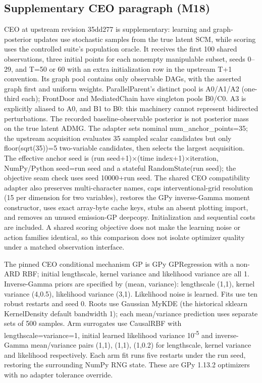\subsection*{Supplementary CEO paragraph (M18)}

CEO at upstream revision 35dd277 is supplementary: learning and graph-posterior updates use stochastic samples from the true latent SCM, while scoring uses the controlled suite's population oracle. It receives the first 100 shared observations, three initial points for each nonempty manipulable subset, seeds 0--29, and T=50 or 60 with an extra initialization row in the upstream T+1 convention. Its graph pool contains only observable DAGs, with the asserted graph first and uniform weights. ParallelParent's distinct pool is A0/A1/A2 (one-third each); FrontDoor and MediatedChain have singleton pools B0/C0. A3 is explicitly aliased to A0, and B1 to B0: this machinery cannot represent bidirected perturbations. The recorded baseline-observable posterior is not posterior mass on the true latent ADMG. The adapter sets nominal num\_anchor\_points=35; the upstream acquisition evaluates 35 sampled scalar candidates but only floor(sqrt(35))=5 two-variable candidates, then selects the largest acquisition. The effective anchor seed is (run seed+1)\ensuremath{\times}(time index+1)\ensuremath{\times}iteration, NumPy/Python seed=run seed and a stateful RandomState(run seed); the objective seam check uses seed 10000+run seed. The shared CEO compatibility adapter also preserves multi-character names, caps interventional-grid resolution (15 per dimension for two variables), restores the GPy inverse-Gamma moment constructor, uses exact array-byte cache keys, stubs an absent plotting import, and removes an unused emission-GP deepcopy. Initialization and sequential costs are included. A shared scoring objective does not make the learning noise or action families identical, so this comparison does not isolate optimizer quality under a matched observation interface.


The pinned CEO conditional mechanism GP is GPy GPRegression with a non-ARD RBF; initial lengthscale, kernel variance and likelihood variance are all 1. Inverse-Gamma priors are specified by (mean, variance): lengthscale (1,1), kernel variance (4,0.5), likelihood variance (3,1). Likelihood noise is learned. Fits use ten robust restarts and seed 0. Roots use Gaussian MyKDE (the historical sklearn KernelDensity default bandwidth 1); each mean/variance prediction uses separate sets of 500 samples. Arm surrogates use CausalRBF with lengthscale=variance=1, initial learned likelihood variance 10\textsuperscript{-}\textsuperscript{5} and inverse-Gamma mean/variance pairs (1,1), (1,1), (1,0.2) for lengthscale, kernel variance and likelihood respectively. Each arm fit runs five restarts under the run seed, restoring the surrounding NumPy RNG state. These are GPy 1.13.2 optimizers with no adapter tolerance override.

